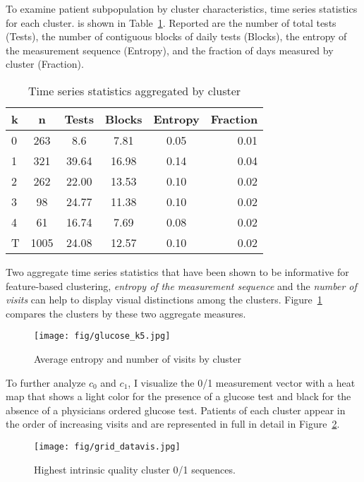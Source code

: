 To examine patient subpopulation by cluster characteristics, time series statistics for each cluster. is shown in Table~\ref{gluc_stats}.  Reported are the number of total tests (Tests), the number of contiguous blocks of daily tests (Blocks), the entropy of the measurement sequence (Entropy), and the fraction of days measured by cluster (Fraction).

\begin{table}
\caption{Time series statistics aggregated by cluster}
\label{gluc_stats}
\vskip 0.15in
\begin{center}
\begin{small}
\begin{sc}
\begin{tabular}{lccccr}
\hline
k 	&n 	&Tests 	&Blocks 	&Entropy 	&Fraction \\
\hline
0	&263	&8.6	&7.81	&0.05	&0.01\\
1	&321	&39.64	&16.98	&0.14	&0.04\\
2	&262	&22.00	     &13.53	&0.10	&0.02\\
3	&98	    &24.77	&11.38	&0.10	&0.02\\
4	&61	    &16.74	&7.69	&0.08	&0.02\\
\hline
T 	&1005	&24.08	&12.57	&0.10	&0.02\\
\hline
\end{tabular}
\end{sc}
\end{small}
\end{center}
\vskip -0.1in
\end{table}

Two aggregate time series statistics that have been shown to be informative for feature-based clustering, \emph{entropy of the measurement sequence} and the \emph{number of visits} can help to display visual distinctions among the clusters.   Figure~\ref{box_glucose} compares the clusters by these two aggregate measures.


\begin{figure}
\begin{center}
\centerline{\texttt{[image: fig/glucose\_k5.jpg]}}
\caption{Average entropy and number of visits by cluster}
\label{box_glucose}
\end{center}
\vskip -0.2in
\end{figure}


To further analyze $c_0$ and $c_1$, I visualize the 0/1 measurement vector with a heat map that shows a light color for the presence of a glucose test and black for the absence of a physicians ordered glucose test. Patients of each cluster appear in the order of increasing visits and are represented in full in detail in Figure~\ref{glucose_seq}.

\begin{figure}
\begin{center}
\centerline{\texttt{[image: fig/grid\_datavis.jpg]}}
\caption{Highest intrinsic quality cluster 0/1 sequences.}
\label{glucose_seq}
\end{center}
\vskip -0.2in
\end{figure}








